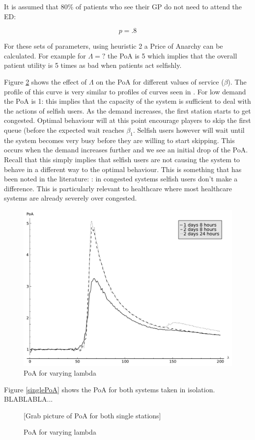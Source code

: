 \documentclass[12pt]{article}
\begin{document}
It is assumed that 80\% of patients who see their GP do not need to attend the ED:

$$p=.8$$

For these sets of parameters, using heuristic 2 a Price of Anarchy can be calculated.
For example for $\Lambda=?$ the PoA is 5 which implies that the overall patient utility is 5 times as bad when patients act selfishly.

Figure \ref{ana_lambda} shows the effect of $\Lambda$ on the PoA for different values of service ($\beta$).
The profile of this curve is very similar to profiles of curves seen in \cite{VKPH}.
For low demand the PoA is 1: this implies that the capacity of the system is sufficient to deal with the actions of selfish users.
As the demand increases, the first station starts to get congested.
Optimal behaviour will at this point encourage players to skip the first queue (before the expected wait reaches $\beta_1$.
Selfish users however will wait until the system becomes very busy before they are willing to start skipping.
This occurs when the demand increases further and we see an initial drop of the PoA.
Recall that this simply implies that selfish users are not causing the system to behave in a different way to the optimal behaviour.
This is something that has been noted in the literature: \cite{bunchofpapers}: in congested systems selfish users don't make a difference.
This is particularly relevant to healthcare where most healthcare systems are already severely over congested.

\begin{figure}[!hbtp]
    \begin{center}
        \includegraphics[width=.5\textwidth]{Images/Ana_Lambda.pdf}
    \end{center}
    \caption{PoA for varying lambda}\label{ana_lambda}
\end{figure}

Figure \ref{singlePoA} shows the PoA for both systems taken in isolation. BLABLABLA...

\begin{figure}[!hbtp]
    \begin{center}
        [Grab picture of PoA for both single stations]
    \end{center}
    \caption{PoA for varying lambda}\label{ana_lambda}
\end{figure}
\end{document}
